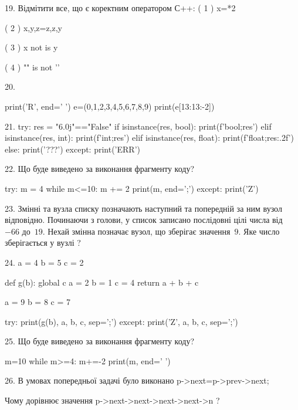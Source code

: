 \documentclass[11pt]{article}
\begin{document}

19. %
Відмітити все, що є коректним оператором С++:
( 1 ) x=*2

( 2 ) x,y,z=z,z,y

( 3 ) x not is y

( 4 ) "\n" is not '\n'


20. 

print('R', end=' ')
e=(0,1,2,3,4,5,6,7,8,9)
print(e[13:13:-2])



21. 
try:
    res = "6.0j"=="False"
    if isinstance(res, bool):
        print(f'bool;{res}')
    elif isinstance(res, int):
        print(f'int;{res}')
    elif isinstance(res, float):
        print(f'float;{res:.2f}')
    else:
        print('???')
except:
    print('ERR')


22. Що буде виведено за виконання фрагменту коду?

try:
    m = 4
    while m<=10:
        m += 2
    print(m, end=';')
except:
    print('Z')



23. 
Змінні  та  вузла списку позначають наступний та попередній за ним вузол відповідно. Починаючи з голови, у список записано послідовні цілі числа від~$-66$ до~$19$. Нехай змінна  позначає вузол, що зберігає значення~$9$.
Яке число зберігається у вузлі  ?


24. 
a = 4
b = 5
c = 2

def g(b):
global c    a = 2
    b = 1
    c = 4
    return a + b + c

a = 9
b = 8
c = 7

try:
    print(g(b), a, b, c, sep=';')
except:
    print('Z', a, b, c, sep=';')


25. Що буде виведено за виконання фрагменту коду?

m=10
while m>=4:
    m+=-2
print(m, end=' ')



26. 
В умовах попередньої задачі було виконано p->next=p->prev->next;

Чому дорівнює значення p->next->next->next->next->n ?
\end{document}
